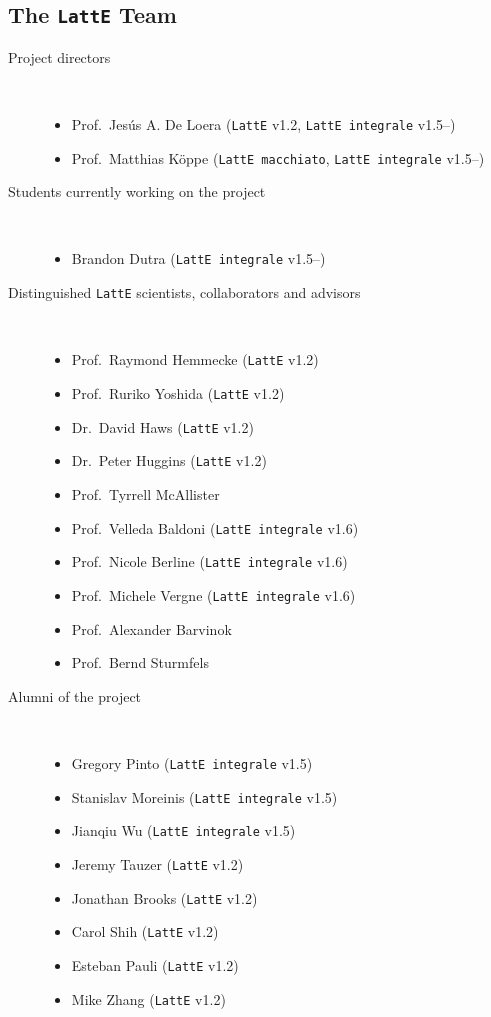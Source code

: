 \documentclass{article}
\newcommand{\latte}{{\tt LattE}\xspace}
\newcommand{\latteInt}{{\tt LattE integrale}\xspace}
\newcommand{\latteMac}{{\tt LattE macchiato}\xspace}
\begin{document}
\subsection{The {\tt LattE} Team}
\begin{description}
\item[Project directors]~
  \begin{itemize}
  \item Prof.~Jes\'us A. De Loera (\latte v1.2, \latteInt v1.5--)
  \item Prof.~Matthias K\"oppe (\latteMac, \latteInt v1.5--)
  \end{itemize}
\item[Students currently working on the project]~
  \begin{itemize}
  \item Brandon Dutra (\latteInt v1.5--)
  \end{itemize}
\item[Distinguished \latte scientists, collaborators and advisors]~
        \begin{itemize} 
                \item Prof.~Raymond Hemmecke (\latte v1.2)
                \item Prof.~Ruriko Yoshida (\latte v1.2)
                \item Dr.~David Haws (\latte v1.2)
                \item Dr.~Peter Huggins (\latte v1.2)
                \item Prof.~Tyrrell McAllister
                \item Prof.~Velleda Baldoni (\latteInt v1.6)
                \item Prof.~Nicole Berline (\latteInt v1.6)
                \item Prof.~Michele Vergne (\latteInt v1.6)
                \item Prof.~Alexander Barvinok
                \item Prof.~Bernd Sturmfels 
        \end{itemize}
\item[Alumni of the project]~
        \begin{itemize}
                \item Gregory Pinto     (\latteInt v1.5)
                \item Stanislav Moreinis (\latteInt v1.5)
                \item Jianqiu Wu (\latteInt v1.5)
                \item Jeremy Tauzer (\latte v1.2)
                \item Jonathan Brooks (\latte v1.2)
                \item Carol Shih (\latte v1.2)
                \item Esteban Pauli (\latte v1.2)
                \item Mike Zhang        (\latte v1.2)
        \end{itemize}
\end{description}
\end{document}
